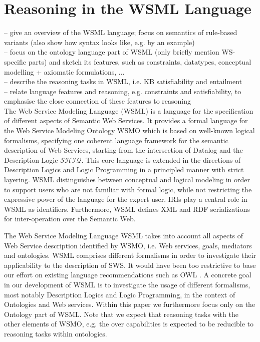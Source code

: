 \section{Reasoning in the WSML Language\label{sec:wsml}}
-- give an overview of the WSML language; focus on semantics of rule-based variants (also show how syntax looks like, e.g. by an example) \\
-- focus on the ontology language part of WSML (only briefly mention WS-specific parts) and sketch its features, such as constraints, datatypes, conceptual modelling + axiomatic formulations, ... \\
-- describe the reasoning tasks in WSML, i.e. KB satisfiability and entailment \\
-- relate language features and reasoning, e.g. constraints and satisfiability, to emphasise the close connection of these features to reasoning \\

The Web Service Modeling Language (WSML) is a language for the
specification of different aspects of Semantic Web Services. It
provides a formal language for the Web Service Modeling Ontology
WSMO which is based on well-known logical formalisms, specifying one
coherent language framework for the semantic description of Web
Services, starting from the intersection of Datalog and the
Description Logic $\mathcal{SHIQ}$. This core language is extended
in the directions of Description Logics and Logic Programming in a
principled manner with strict layering. WSML distinguishes between
conceptual and logical modeling in order to support users who are
not familiar with formal logic, while not restricting the expressive
power of the language  for the expert user. IRIs play a central role
in WSML as identifiers. Furthermore, WSML defines XML and RDF
serializations for inter-operation over the Semantic Web.

The Web Service Modeling Language WSML takes into account all
aspects of Web Service description identified by WSMO, i.e. Web
services, goals, mediators and ontologies. WSML comprises different
formalisms in order to investigate their applicability to the
description of SWS. It would have been too restrictive to base our
effort on existing language recommendations such as OWL
\cite{Dean+Schreiber-OntoLangRefe:04}. A concrete goal in our
development of WSML is to investigate the usage of different
formalisms, most notably Description Logics and Logic Programming,
in the context of Ontologies and Web services. Within this paper we
furthermore focus only on the Ontology part of WSML. Note that we
expect that reasoning tasks with the other elements of WSMO, e.g.
the over capabilities is expected to be reducible to reasoning tasks
within ontologies.

